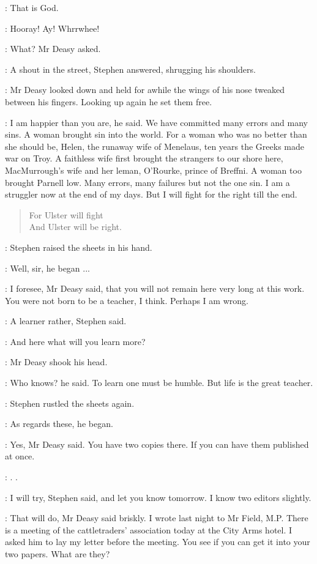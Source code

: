 \Stephen:
That is God.

\voice:
Hooray! Ay! Whrrwhee!

\deasy:
What? Mr Deasy asked.

\Stephen:
A shout in the street, Stephen answered, shrugging his shoulders.

:
Mr Deasy looked down and held for awhile the wings of his nose
tweaked between his fingers. Looking up again he set them free.

\deasy:
I am happier than you are, he said. We have committed many errors and
many sins. A woman brought sin into the world. For a woman who was no
better than she should be, Helen, the runaway wife of Menelaus, ten years
the Greeks made war on Troy. A faithless wife first brought the strangers
to our shore here, MacMurrough's wife and her leman, O'Rourke, prince of
Breffni. A woman too brought Parnell low. Many errors, many failures but
not the one sin. I am a struggler now at the end of my days. But I will
fight for the right till the end.

\begin{verse}
    For Ulster will fight \\
    And Ulster will be right.
\end{verse}


:
Stephen raised the sheets in his hand.

\Stephen:
Well, sir, he began ...

\deasy:
I foresee, Mr Deasy said, that you will not remain here very long at
this work. You were not born to be a teacher, I think. Perhaps I am
wrong.

\Stephen:
A learner rather, Stephen said.

\StephenInt:
And here what will you learn more?

:
Mr Deasy shook his head.

\deasy:
Who knows? he said. To learn one must be humble. But life is the great
teacher.

:
Stephen rustled the sheets again.

\Stephen:
As regards these, he began.

\deasy:
Yes, Mr Deasy said. You have two copies there. If you can have them
published at once.

\StephenInt:
. .

\Stephen:
I will try, Stephen said, and let you know tomorrow. I know two editors
slightly.

\deasy:
That will do, Mr Deasy said briskly. I wrote last night to Mr Field,
M.P. There is a meeting of the cattletraders' association today at the
City Arms hotel. I asked him to lay my letter before the meeting. You see
if you can get it into your two papers. What are they?

